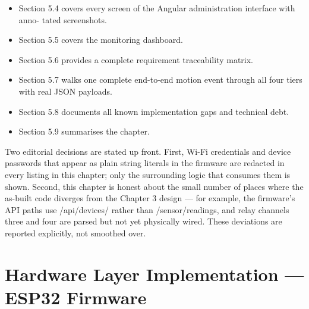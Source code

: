 \begin{itemize}
  \item Section 5.4 covers every screen of the Angular administration interface with anno-
tated screenshots.
\end{itemize}


\begin{itemize}
  \item Section 5.5 covers the monitoring dashboard.
\end{itemize}


\begin{itemize}
  \item Section 5.6 provides a complete requirement traceability matrix.
\end{itemize}


\begin{itemize}
  \item Section 5.7 walks one complete end-to-end motion event through all four tiers with
real JSON payloads.
\end{itemize}


\begin{itemize}
  \item Section 5.8 documents all known implementation gaps and technical debt.
\end{itemize}


\begin{itemize}
  \item Section 5.9 summarises the chapter.
\end{itemize}



Two editorial decisions are stated up front. First, Wi-Fi credentials and device passwords that appear as plain string literals in the ﬁrmware are redacted in every listing in
this chapter; only the surrounding logic that consumes them is shown. Second, this chapter is honest about the small number of places where the as-built code diverges from the
Chapter 3 design --- for example, the ﬁrmware's API paths use /api/devices/ rather than
/sensor/readings, and relay channels three and four are parsed but not yet physically
wired. These deviations are reported explicitly, not smoothed over.



\section{Hardware Layer Implementation --- ESP32 Firmware}



